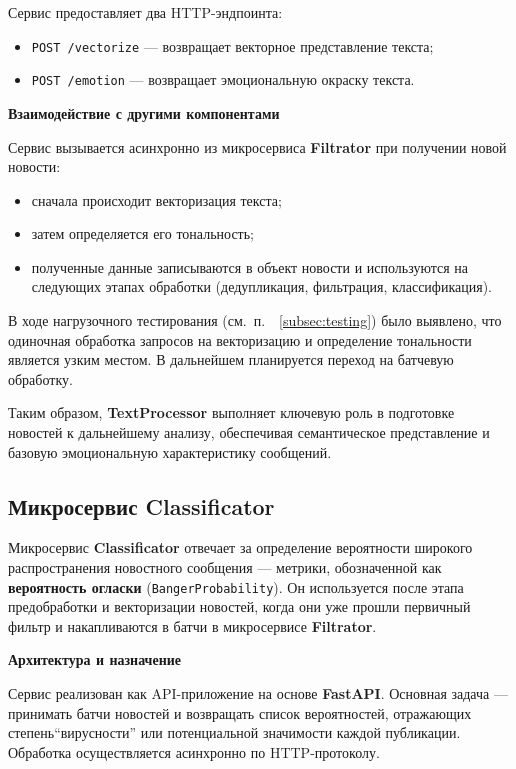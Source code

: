Сервис предоставляет два HTTP-эндпоинта:
\begin{itemize}
    \item \texttt{POST /vectorize} — возвращает векторное представление текста;
    \item \texttt{POST /emotion} — возвращает эмоциональную окраску текста.
\end{itemize}

\textbf{Взаимодействие с другими компонентами}

Сервис вызывается асинхронно из микросервиса \textbf{Filtrator} при получении новой новости:
\begin{itemize}
    \item сначала происходит векторизация текста;
    \item затем определяется его тональность;
    \item полученные данные записываются в объект новости и используются на следующих этапах обработки (дедупликация, фильтрация, классификация).
\end{itemize}

В ходе нагрузочного тестирования (см.\ п.\ ~\ref{subsec:testing}) было выявлено, что одиночная обработка запросов на векторизацию и определение тональности является узким местом. В дальнейшем планируется переход на батчевую обработку.

Таким образом, \textbf{TextProcessor} выполняет ключевую роль в подготовке новостей к дальнейшему анализу, обеспечивая семантическое представление и базовую эмоциональную характеристику сообщений.

\subsection{Микросервис Classificator}
Микросервис \textbf{Classificator} отвечает за определение вероятности широкого распространения новостного сообщения — метрики, обозначенной как \textbf{вероятность огласки} (\texttt{BangerProbability}).
Он используется после этапа предобработки и векторизации новостей, когда они уже прошли первичный фильтр и накапливаются в батчи в микросервисе \textbf{Filtrator}.

\textbf{Архитектура и назначение}

Сервис реализован как API-приложение на основе \textbf{FastAPI}.
Основная задача — принимать батчи новостей и возвращать список вероятностей, отражающих степень``вирусности'' или потенциальной значимости каждой публикации.
Обработка осуществляется асинхронно по HTTP-протоколу.

